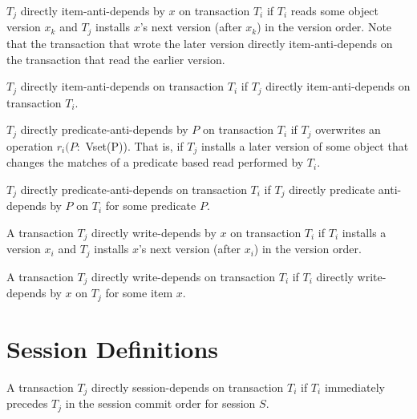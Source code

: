 \begin{definition}
$T_j$ directly item-anti-depends by $x$ on transaction $T_i$ if $T_i$
  reads some object version $x_k$ and $T_j$ installs $x$'s next
  version (after $x_k$) in the version order. Note that the
  transaction that wrote the later version directly item-anti-depends
  on the transaction that read the earlier version.
\end{definition}

\begin{definition}
$T_j$ directly item-anti-depends on transaction $T_i$ if $T_j$
  directly item-anti-depends on transaction $T_i$.
\end{definition}

\begin{definition}
$T_j$ directly predicate-anti-depends by $P$ on transaction $T_i$ if
  $T_j$ overwrites an operation $r_i(P:$ Vset(P)). That is, if $T_j$
  installs a later version of some object that changes the matches of
  a predicate based read performed by $T_i$.
\end{definition}

\begin{definition}
$T_j$ directly predicate-anti-depends on transaction $T_i$ if $T_j$
  directly predicate anti-depends by $P$ on $T_i$ for some predicate
  $P$.
\end{definition}

\begin{definition}
A transaction $T_j$ directly write-depends by $x$ on transaction $T_i$
if $T_i$ installs a version $x_i$ and $T_j$ installs $x$'s next
version (after $x_i$) in the version order.
\end{definition}

\begin{definition}
A transaction $T_j$ directly write-depends on transaction $T_i$ if
$T_i$ directly write-depends by $x$ on $T_j$ for some item $x$.
\end{definition}

\section{Session Definitions}

\begin{definition}
A transaction $T_j$ directly session-depends on transaction $T_i$ if
$T_i$ immediately precedes $T_j$ in the session commit order for session $S$.
\end{definition}


